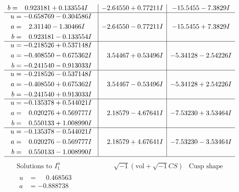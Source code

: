 \documentclass[1p]{elsarticle_modified}
\theoremstyle{definition}
\newcommand{\I}{\sqrt{-1}}
\begin{document}
$$\begin{array}{c|c|c}
\begin{aligned}
b &= \phantom{-}0.923181 + 0.133554 I\end{aligned}
 & -2.64550 + 0.77211 I & -15.5455 - 7.3829 I \\ \hline\begin{aligned}
u &= -0.658769 - 0.304586 I \\
a &= \phantom{-}2.31140 - 1.30466 I \\
b &= \phantom{-}0.923181 - 0.133554 I\end{aligned}
 & -2.64550 - 0.77211 I & -15.5455 + 7.3829 I \\ \hline\begin{aligned}
u &= -0.218526 + 0.537148 I \\
a &= -0.408550 - 0.675362 I \\
b &= -0.241540 - 0.913033 I\end{aligned}
 & \phantom{-}3.54467 + 0.53496 I & -5.34128 - 2.54226 I \\ \hline\begin{aligned}
u &= -0.218526 - 0.537148 I \\
a &= -0.408550 + 0.675362 I \\
b &= -0.241540 + 0.913033 I\end{aligned}
 & \phantom{-}3.54467 - 0.53496 I & -5.34128 + 2.54226 I \\ \hline\begin{aligned}
u &= -0.135378 + 0.544021 I \\
a &= \phantom{-}0.020276 + 0.569777 I \\
b &= \phantom{-}0.550133 + 1.008990 I\end{aligned}
 & \phantom{-}2.18579 - 4.67641 I & -7.53230 + 3.53464 I \\ \hline\begin{aligned}
u &= -0.135378 - 0.544021 I \\
a &= \phantom{-}0.020276 - 0.569777 I \\
b &= \phantom{-}0.550133 - 1.008990 I\end{aligned}
 & \phantom{-}2.18579 + 4.67641 I & -7.53230 - 3.53464 I\\
 \hline 
 \end{array}$$\newpage$$\begin{array}{c|c|c}  
\text{Solutions to }I^u_{1}& \I (\text{vol} + \sqrt{-1}CS) & \text{Cusp shape}\\
 \hline 
\begin{aligned}
u &= \phantom{-}0.468563\phantom{ +0.000000I} \\
a &= -0.888738\phantom{ +0.000000I} \\

\end{aligned}
\end{array}$$
\end{document}
